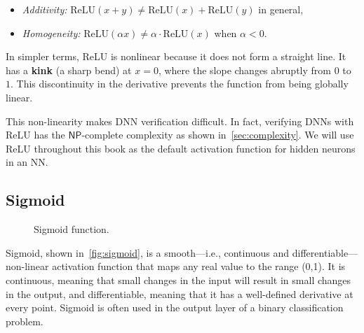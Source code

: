 \documentclass[oneside,11pt,dvipsnames]{book}
\numberwithin{equation}{section}
\theoremstyle{definition}
\theoremstyle{remark}
\begin{document}
    \begin{itemize}
        \item \textit{Additivity:} $\text{ReLU}(x + y) \ne \text{ReLU}(x) + \text{ReLU}(y)$ in general,
        \item \textit{Homogeneity:} $\text{ReLU}(\alpha x) \ne \alpha \cdot \text{ReLU}(x)$ when $\alpha < 0$.
    \end{itemize}

In simpler terms, ReLU is nonlinear because it does not form a straight line.  It has a \textbf{kink} (a sharp bend) at $x = 0$, where the slope changes abruptly from $0$ to $1$. This discontinuity in the derivative prevents the function from being globally linear.


This non-linearity makes DNN verification difficult. In fact, verifying DNNs with ReLU has the $\mathsf{NP}$-complete complexity as shown in~\autoref{sec:complexity}. We will use ReLU throughout this book as the default activation function for hidden neurons in an NN.

\subsection{Sigmoid}\label{sec:sigmoid}



\begin{figure}[ht]
    \centering
    \caption{Sigmoid function.}\label{fig:sigmoid}
\end{figure}

Sigmoid, shown in~\autoref{fig:sigmoid}, is a smooth---i.e., continuous and differentiable---non-linear activation function that maps any real value to the range (0,1).
It is continuous, meaning that small changes in the input will result in small changes in the output, and differentiable, meaning that it has a well-defined derivative at every point. Sigmoid is often used in the output layer of a binary classification problem.
\end{document}
